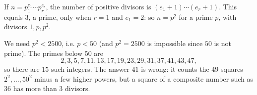 If $n=p_1^{e_1}\cdots p_r^{e_r}$, the number of positive divisors is $(e_1+1)\cdots(e_r+1)$. This equals $3$, a prime, only when $r=1$ and $e_1=2$: so $n=p^2$ for a prime $p$, with divisors $1,p,p^2$.

We need $p^2<2500$, i.e. $p<50$ (and $p^2=2500$ is impossible since $50$ is not prime). The primes below $50$ are
\[
2,3,5,7,11,13,17,19,23,29,31,37,41,43,47,
\]
so there are $\boxed{15}$ such integers. The answer $41$ is wrong: it counts the $49$ squares $2^2,\dots,50^2$ minus a few higher powers, but a square of a composite number such as $36$ has more than $3$ divisors.
